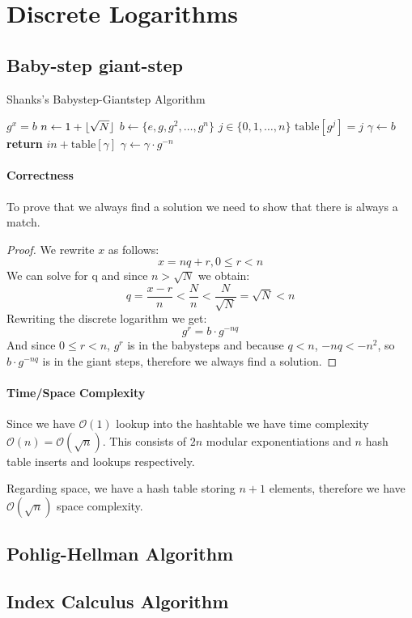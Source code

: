 

\chapter{Discrete Logarithms}

\section{Baby-step giant-step}

\begin{algorithm}[H]
  \caption{Shanks's Babystep-Giantstep Algorithm}
  \begin{algorithmic}
   \Require $g^x = b$
   \State $n \gets 1 + \lfloor\sqrt{N}\rfloor$ 
   \State $b \gets \{e, g, g^2, \dots, g^n\}$
   \For $j \in \{0,1,\dots,n\}$
     \State $\text{table}[g^j] = j$
   \EndFor
   \State $\gamma \gets b$
       \State \textbf{return} $in + \text{table}[\gamma]$
     \Else
       \State $\gamma \gets \gamma \cdot g^{-n}$
     \EndIf
   \EndFor
     
  \end{algorithmic}
\end{algorithm}

\subsubsection{Correctness}

To prove that we always find a solution we need to show that there is always a match.

\begin{proof}
  We rewrite $x$ as follows:
  \[ x = nq + r, 0 \leq r < n \]
  We can solve for q and since $n > \sqrt{N}$ we obtain:
  \[ q = \frac{x-r}{n} < \frac{N}{n} < \frac{N}{\sqrt{N}} = \sqrt{N} < n \]
  Rewriting the discrete logarithm we get:
  \[ g^r = b\cdot g^{-nq} \]
  And since $0 \leq r < n$, $g^r$ is in the babysteps and because $q < n$, $-nq < -n^2$, so $b\cdot g^{-nq}$ is in the giant steps, therefore we always find a solution.
  
\end{proof}

\subsubsection{Time/Space Complexity}
Since we have $\mathcal{O}(1)$ lookup into the hashtable we have time complexity $\mathcal{O}(n) = \mathcal{O}(\sqrt{n})$. This consists of $2n$ modular exponentiations and $n$ hash table inserts and lookups respectively.

Regarding space, we have a hash table storing $n + 1$ elements, therefore we have $\mathcal{O}(\sqrt{n})$ space complexity.

\section{Pohlig-Hellman Algorithm}
\section{Index Calculus Algorithm}